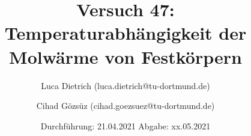 

\subject{Fortgeschrittenenpraktikum der Fakultät Physik}
\title{Versuch 47: Temperaturabhängigkeit der Molwärme von Festkörpern}
\author{Luca Dietrich (luca.dietrich@tu-dortmund.de) \and Cihad Gözsüz (cihad.goezsuez@tu-dortmund.de)}
\date{%
  Durchführung: 21.04.2021
  \hspace{3em}
  Abgabe: xx.05.2021
}
\publishers{TU Dortmund – Fakultät Physik}


\maketitle
\thispagestyle{empty}
\tableofcontents
\newpage






\printbibliography{}


